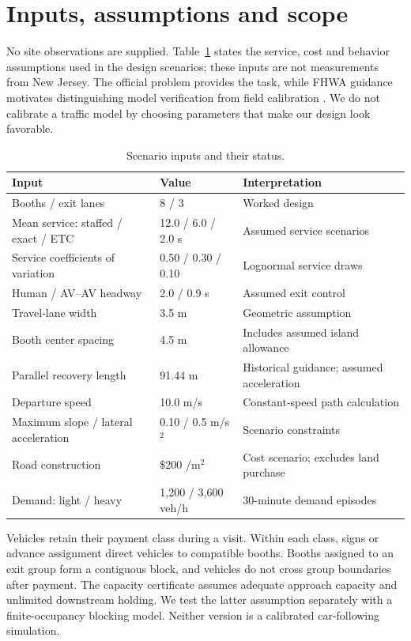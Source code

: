 \documentclass[12pt,letterpaper]{article}
\begin{document}
\section{Inputs, assumptions and scope}
No site observations are supplied. Table~\ref{tab:inputs} states the service, cost and behavior assumptions used in the design scenarios; these inputs are not measurements from New Jersey. The official problem provides the task, while FHWA guidance motivates distinguishing model verification from field calibration \cite{fhwa}. We do not calibrate a traffic model by choosing parameters that make our design look favorable.

\begin{table}[H]\centering\small\caption{Scenario inputs and their status.}\label{tab:inputs}\begin{tabular}{@{}p{.34\linewidth}p{.25\linewidth}p{.32\linewidth}@{}}\toprule
Input & Value & Interpretation\\\midrule
Booths / exit lanes & 8 / 3 & Worked design\\
Mean service: staffed / exact / ETC & 12.0 / 6.0 / 2.0 s & Assumed service scenarios\\
Service coefficients of variation & 0.50 / 0.30 / 0.10 & Lognormal service draws\\
Human / AV--AV headway & 2.0 / 0.9 s & Assumed exit control\\
Travel-lane width & 3.5 m & Geometric assumption\\
Booth center spacing & 4.5 m & Includes assumed island allowance\\
Parallel recovery length & 91.44 m & Historical guidance; assumed acceleration\\
Departure speed & 10.0 m/s & Constant-speed path calculation\\
Maximum slope / lateral acceleration & 0.10 / 0.5 m/s$^2$ & Scenario constraints\\
Road construction & \$200 /m$^2$ & Cost scenario; excludes land purchase\\
Demand: light / heavy & 1,200 / 3,600 veh/h & 30-minute demand episodes\\
\bottomrule\end{tabular}\end{table}
Vehicles retain their payment class during a visit. Within each class, signs or advance assignment direct vehicles to compatible booths. Booths assigned to an exit group form a contiguous block, and vehicles do not cross group boundaries after payment. The capacity certificate assumes adequate approach capacity and unlimited downstream holding. We test the latter assumption separately with a finite-occupancy blocking model. Neither version is a calibrated car-following simulation.
\end{document}
